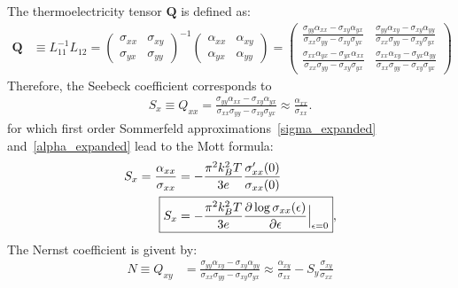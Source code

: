 \documentclass[notitlepage,11pt,nofootinbib]{revtex4-1}
\begin{document}
The thermoelectricity tensor $\boldsymbol{Q}$ is defined as:
\begin{align}
\boldsymbol{Q} &\equiv L_{11}^{-1}L_{12}
=
\begin{pmatrix}
\sigma_{xx} & \sigma_{xy}\\
\sigma_{yx} & \sigma_{yy}
\end{pmatrix}^{-1}
\begin{pmatrix}
\alpha_{xx} & \alpha_{xy}\\
\alpha_{yx} & \alpha_{yy}
\end{pmatrix}
=
\begin{pmatrix}
  \frac{\sigma_{yy}\alpha_{xx}-\sigma_{xy}\alpha_{yx}}
  {\sigma_{xx}\sigma_{yy}-\sigma_{xy}\sigma_{yx}} 
& \frac{\sigma_{yy}\alpha_{xy}-\sigma_{xy}\alpha_{yy}}
  {\sigma_{xx}\sigma_{yy}-\sigma_{xy}\sigma_{yx}}\\
  \frac{\sigma_{xx}\alpha_{yx}-\sigma_{yx}\alpha_{xx}}
  {\sigma_{xx}\sigma_{yy}-\sigma_{xy}\sigma_{yx}}
& \frac{\sigma_{xx}\alpha_{xy}-\sigma_{yx}\alpha_{yy}}
  {\sigma_{xx}\sigma_{yy}-\sigma_{xy}\sigma_{yx}}
\end{pmatrix}
\end{align}
Therefore, the Seebeck coefficient corresponds to
\begin{align}
S_x
\equiv 
Q_{xx} 
=
\frac{\sigma_{yy}\alpha_{xx}-\sigma_{xy}\alpha_{yx}}{\sigma_{xx}\sigma_{yy}-\sigma_{xy}\sigma_{yx}} 
\approx 
\boxed{
\frac{\alpha_{xx}}{\sigma_{xx}}
}.
\label{eq_seebeck}
\end{align}
for which first order Sommerfeld approximations~\eqref{sigma_expanded} and~\eqref{alpha_expanded} lead to the Mott formula:
\begin{align}
S_x = \frac{\alpha_{xx}}{\sigma_{xx}} 
&= - \frac{\pi^2 k_B^2 T}{3e}\frac{ \sigma'_{xx}(0)}{ \sigma_{xx}(0)}
\\
\Aboxed{
S_x
& = - \frac{\pi^2 k_B^2 T}{3e}\frac{\partial \log \sigma_{xx}(\epsilon) }{\partial \epsilon}\Big\vert_{\epsilon=0}
},
\end{align}
The Nernst coefficient is givent by:
\begin{align}
N 
\equiv
Q_{xy}
&= 
\frac{\sigma_{yy}\alpha_{xy}-\sigma_{xy}\alpha_{yy}}
{\sigma_{xx}\sigma_{yy}-\sigma_{xy}\sigma_{yx}}
\approx 
\boxed{
\frac{\alpha_{xy}}{\sigma_{xx}}
- S_{y}\frac{\sigma_{xy}}{\sigma_{xx}}
}
\end{align}
\end{document}
